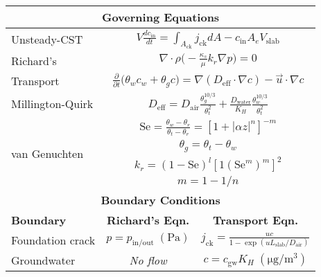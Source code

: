 \begin{table}[htb!]
  \setlength{\tabcolsep}{1pt}
  \centering
  \begin{tabular}{l c c c c c c}
    \toprule
    \multicolumn{7}{c}{\textbf{Governing Equations}} \\
    \midrule
    Unsteady-CST & \multicolumn{6}{c}{$V\frac{d c_\mathrm{in}}{d t} = \int_{A_\mathrm{ck}} j_\mathrm{ck} dA - c_\mathrm{in} A_e V_\mathrm{slab}$} \\
    Richard's & \multicolumn{6}{c}{$\nabla \cdot \rho \Big( - \frac{\kappa_s}{\mu} k_r \nabla p \Big) = 0$} \\
    Transport & \multicolumn{6}{c}{$\frac{\partial}{\partial t} \Big( \theta_w c_w + \theta_g c \Big) = \nabla (D_\mathrm{eff} \cdot \nabla c) - \vec{u} \cdot \nabla c$} \\
    Millington-Quirk & \multicolumn{6}{c}{$D_\mathrm{eff} = D_\mathrm{air}\frac{\theta_g^{10/3}}{\theta_t^2} + \frac{D_\mathrm{water}}{K_H} \frac{\theta_w^{10/3}}{\theta_t^2}$} \\
    \multirow{4}{*}{van Genuchten} & \multicolumn{6}{c}{$\mathrm{Se} = \frac{\theta_w - \theta_r}{\theta_t - \theta_r} = [1 + |\alpha z|^n]^{-m}$} \\
     & \multicolumn{6}{c}{$\theta_g = \theta_t - \theta_w$}\\
     & \multicolumn{6}{c}{$k_r = (1-\mathrm{Se})^{l}[1(\mathrm{Se}^{m})^m]^2$} \\
     & \multicolumn{6}{c}{$m = 1 - 1/n$} \\
    \midrule
    \multicolumn{7}{c}{\textbf{Boundary Conditions}} \\
    \midrule
    \textbf{Boundary} & \multicolumn{3}{c}{\textbf{Richard's Eqn.}} & \multicolumn{3}{c}{\textbf{Transport Eqn.}} \\
    Foundation crack & \multicolumn{3}{c}{$p = p_\mathrm{in/out} \; \mathrm{(Pa)}$} & \multicolumn{3}{c}{$j_\mathrm{ck} = \frac{u c}{1 - \exp{(u L_\mathrm{slab}/D_\mathrm{air})}}$} \\
    Groundwater & \multicolumn{3}{c}{\textit{No flow}} & \multicolumn{3}{c}{$c = c_\mathrm{gw} K_H \; \mathrm{(\mu g/m^3)}$} \\

\end{tabular}
\end{table}
